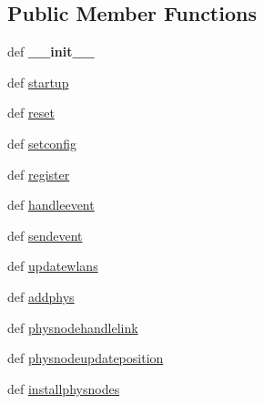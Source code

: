 \subsection*{Public Member Functions}
\begin{DoxyCompactItemize}
\item 
\hypertarget{classcore_1_1mobility_1_1_mobility_manager_ad8efc7a9a5794f273f07ba9698327bdd}{def {\bfseries \+\_\+\+\_\+init\+\_\+\+\_\+}}\label{classcore_1_1mobility_1_1_mobility_manager_ad8efc7a9a5794f273f07ba9698327bdd}

\item 
def \hyperlink{classcore_1_1mobility_1_1_mobility_manager_a5fdbc1b4a657927c9a290bc59d2d4748}{startup}
\item 
def \hyperlink{classcore_1_1mobility_1_1_mobility_manager_a86f08468b95e532bb79491027ee067cb}{reset}
\item 
def \hyperlink{classcore_1_1mobility_1_1_mobility_manager_a89b4494f5f0fb6ca93305db2903c3a42}{setconfig}
\item 
def \hyperlink{classcore_1_1mobility_1_1_mobility_manager_a244411166eec763ad4cec4a5571e4d2f}{register}
\item 
def \hyperlink{classcore_1_1mobility_1_1_mobility_manager_a5252407a8b87e97a3be3ee0f2b25812b}{handleevent}
\item 
def \hyperlink{classcore_1_1mobility_1_1_mobility_manager_ac7f2eab49c1b2b7cc086ff9413d85404}{sendevent}
\item 
def \hyperlink{classcore_1_1mobility_1_1_mobility_manager_a86a4e1ae42f870edb0c5e800a75a1a84}{updatewlans}
\item 
def \hyperlink{classcore_1_1mobility_1_1_mobility_manager_a83e26d51ef63a154ddb450612ed1c60d}{addphys}
\item 
def \hyperlink{classcore_1_1mobility_1_1_mobility_manager_afb22fcf36de5fc7025cd3b5a7279384e}{physnodehandlelink}
\item 
def \hyperlink{classcore_1_1mobility_1_1_mobility_manager_a9e5c876b380496484b44aed62b7bb7a2}{physnodeupdateposition}
\item 
def \hyperlink{classcore_1_1mobility_1_1_mobility_manager_a52fe42ac4d4e61551a7febe5806b8102}{installphysnodes}
\end{DoxyCompactItemize}
